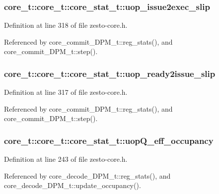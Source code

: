 \subsubsection[{uop\_\-issue2exec\_\-slip}]{ core\_\-t::core\_\-t::core\_\-stat\_\-t::uop\_\-issue2exec\_\-slip}\label{structcore__t_1_1core__stat__t_0091584a14f71deacbbb940022cfee09}




Definition at line 318 of file zesto-core.h.

Referenced by core\_\-commit\_\-DPM\_\-t::reg\_\-stats(), and core\_\-commit\_\-DPM\_\-t::step().
\subsubsection[{uop\_\-ready2issue\_\-slip}]{ core\_\-t::core\_\-t::core\_\-stat\_\-t::uop\_\-ready2issue\_\-slip}\label{structcore__t_1_1core__stat__t_a149b0bc43f0c6f36c02c682535ef69b}




Definition at line 317 of file zesto-core.h.

Referenced by core\_\-commit\_\-DPM\_\-t::reg\_\-stats(), and core\_\-commit\_\-DPM\_\-t::step().
\subsubsection[{uopQ\_\-eff\_\-occupancy}]{ core\_\-t::core\_\-t::core\_\-stat\_\-t::uopQ\_\-eff\_\-occupancy}\label{structcore__t_1_1core__stat__t_5e331f26fe1d4b3d798b33566f8eeb9c}




Definition at line 243 of file zesto-core.h.

Referenced by core\_\-decode\_\-DPM\_\-t::reg\_\-stats(), and core\_\-decode\_\-DPM\_\-t::update\_\-occupancy().

